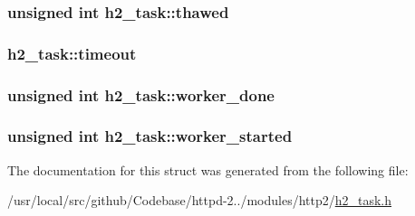 \subsubsection[{\texorpdfstring{thawed}{thawed}}]{\setlength{\rightskip}{0pt plus 5cm}unsigned {\bf int} h2\+\_\+task\+::thawed}\hypertarget{structh2__task_aec7b0cca43b057051907da207a95958a}{}\label{structh2__task_aec7b0cca43b057051907da207a95958a}
\subsubsection[{\texorpdfstring{timeout}{timeout}}]{ h2\+\_\+task\+::timeout}\hypertarget{structh2__task_a279d7cdc9f827fcfafdb24868018ec89}{}\label{structh2__task_a279d7cdc9f827fcfafdb24868018ec89}
\subsubsection[{\texorpdfstring{worker\+\_\+done}{worker_done}}]{\setlength{\rightskip}{0pt plus 5cm}unsigned {\bf int} h2\+\_\+task\+::worker\+\_\+done}\hypertarget{structh2__task_afdaef75e0241b6099654f12255202845}{}\label{structh2__task_afdaef75e0241b6099654f12255202845}
\subsubsection[{\texorpdfstring{worker\+\_\+started}{worker_started}}]{\setlength{\rightskip}{0pt plus 5cm}unsigned {\bf int} h2\+\_\+task\+::worker\+\_\+started}\hypertarget{structh2__task_aedbac35d4cfc160ffbf7d50779e9fce8}{}\label{structh2__task_aedbac35d4cfc160ffbf7d50779e9fce8}


The documentation for this struct was generated from the following file\+:\begin{DoxyCompactItemize}
\item 
/usr/local/src/github/\+Codebase/httpd-\/2../modules/http2/\hyperlink{h2__task_8h}{h2\+\_\+task.\+h}\end{DoxyCompactItemize}

